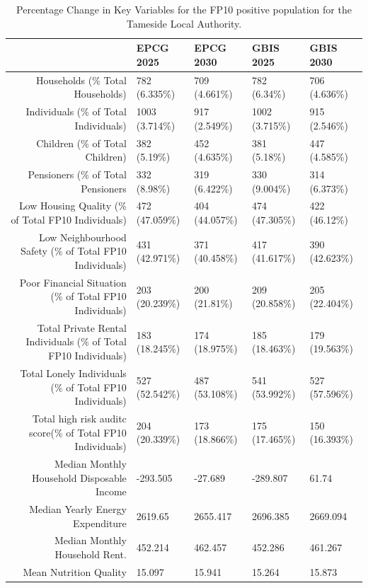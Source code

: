 \begin{table}[ht]
\centering
\begingroup\scriptsize
\begin{tabular}{rllll}
  \hline
 & EPCG 2025 & EPCG 2030 & GBIS 2025 & GBIS 2030 \\ 
  \hline
Households (\% Total Households) & 782 (6.335\%) & 709 (4.661\%) & 782 (6.34\%) & 706 (4.636\%) \\ 
  Individuals (\% of Total Individuals) & 1003 (3.714\%) & 917 (2.549\%) & 1002 (3.715\%) & 915 (2.546\%) \\ 
  Children (\% of Total Children) & 382 (5.19\%) & 452 (4.635\%) & 381 (5.18\%) & 447 (4.585\%) \\ 
  Pensioners (\% of Total Pensioners & 332 (8.98\%) & 319 (6.422\%) & 330 (9.004\%) & 314 (6.373\%) \\ 
  Low Housing Quality (\% of Total FP10 Individuals) & 472 (47.059\%) & 404 (44.057\%) & 474 (47.305\%) & 422 (46.12\%) \\ 
  Low Neighbourhood Safety (\% of Total FP10 Individuals) & 431 (42.971\%) & 371 (40.458\%) & 417 (41.617\%) & 390 (42.623\%) \\ 
  Poor Financial Situation (\% of Total FP10 Individuals) & 203 (20.239\%) & 200 (21.81\%) & 209 (20.858\%) & 205 (22.404\%) \\ 
  Total Private Rental Individuals (\% of Total FP10 Individuals) & 183 (18.245\%) & 174 (18.975\%) & 185 (18.463\%) & 179 (19.563\%) \\ 
  Total Lonely Individuals (\% of Total FP10 Individuals) & 527 (52.542\%) & 487 (53.108\%) & 541 (53.992\%) & 527 (57.596\%) \\ 
  Total high risk auditc score(\% of Total FP10 Individuals) & 204 (20.339\%) & 173 (18.866\%) & 175 (17.465\%) & 150 (16.393\%) \\ 
  Median Monthly Household Disposable Income & -293.505 & -27.689 & -289.807 & 61.74 \\ 
  Median Yearly Energy Expenditure & 2619.65 & 2655.417 & 2696.385 & 2669.094 \\ 
  Median Monthly Household Rent. & 452.214 & 462.457 & 452.286 & 461.267 \\ 
  Mean Nutrition Quality & 15.097 & 15.941 & 15.264 & 15.873 \\ 
   \hline
\end{tabular}
\endgroup
\caption{Percentage Change in Key Variables for the FP10 positive population  for the Tameside Local Authority.} 
\label{tab: tameside_circumstances_table}
\end{table}
